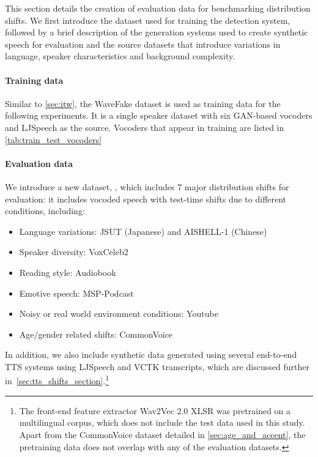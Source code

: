 This section details the creation of evaluation data for benchmarking distribution shifts. We first introduce the dataset used for training the detection system, followed by a brief description of the generation systems used to create synthetic speech for evaluation and the source datasets that introduce variations in language, speaker characteristics and background complexity.

\paragraph{Training data} Similar to \autoref{sec:itw}, the WaveFake dataset is used as training data for the following experiments. It is a single speaker dataset with six GAN-based vocoders and LJSpeech as the source. Vocoders that appear in training are listed in \autoref{tab:train_test_vocoders} 

\paragraph{Evaluation data}  
We introduce a new dataset, \methodName, which includes 7 major distribution shifts for evaluation: it includes vocoded speech with test-time shifts due to different conditions, including:
\begin{itemize}
    \item Language variations: JSUT (Japanese) \cite{sonobe2017jsutcorpusfreelargescale} and AISHELL-1 (Chinese)\cite{bu2017aishell1opensourcemandarinspeech}
    \item Speaker diversity: VoxCeleb2 \cite{Chung18b}
    \item Reading style: Audiobook \cite{7178964}
    \item Emotive speech: MSP-Podcast \cite{Lotfian_2019_3}
    \item Noisy or real world environment conditions: Youtube \cite{chen2021gigaspeechevolvingmultidomainasr}
    \item Age/gender related shifts: CommonVoice \cite{ardila2020commonvoicemassivelymultilingualspeech}
\end{itemize}

In addition, we also include synthetic data generated using several end-to-end TTS systems \cite{kim2020glowttsgenerativeflowtexttospeech,kim2021conditionalvariationalautoencoderadversarial,popov2021gradttsdiffusionprobabilisticmodel,casanova2024xttsmassivelymultilingualzeroshot}  using LJSpeech \cite{ljspeech17} and VCTK transcripts, which are discussed further in~\autoref{sec:tts_shifts_section}.\footnote{The front-end feature extractor Wav2Vec 2.0 XLSR was pretrained on a multilingual corpus, which does not include the test data used in this study. Apart from the CommonVoice dataset detailed in \autoref{sec:age_and_accent}, the pretraining data does not overlap with any of the evaluation datasets.}



